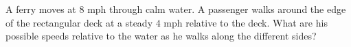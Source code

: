 A ferry moves at $8$ mph through calm water. A passenger walks around the edge of the rectangular deck at a steady $4$ mph relative to the deck. What are his possible speeds relative to the water as he walks along the different sides?
